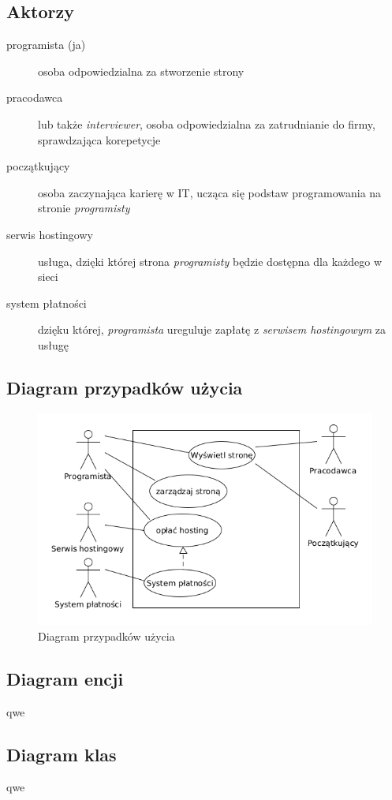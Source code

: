 \documentclass[11pt]{article}
\begin{document}
\subsection{Aktorzy}
\label{sec:org091554e}
\begin{description}
\item[{programista (ja)}] osoba odpowiedzialna za stworzenie strony
\item[{pracodawca}] lub także \emph{interviewer}, osoba odpowiedzialna za zatrudnianie do firmy, sprawdzająca korepetycje
\item[{początkujący}] osoba zaczynająca karierę w IT, ucząca się podstaw programowania na stronie \emph{programisty}
\item[{serwis hostingowy}] usługa, dzięki której strona \emph{programisty} będzie dostępna dla każdego w sieci
\item[{system płatności}] dzięku której, \emph{programista} ureguluje zapłatę z \emph{serwisem hostingowym} za usługę
\end{description}
\subsection{Diagram przypadków użycia}
\label{sec:org9f84e64}
\begin{figure}[htbp]
\centering
\includegraphics[width=.9\linewidth]{./images/diagram_przypadkow_uzycia.png}
\caption{Diagram przypadków użycia}
\end{figure}
\subsection{Diagram encji}
\label{sec:orge6cdeab}
qwe
\subsection{Diagram klas}
\label{sec:org7884d62}
qwe
\end{document}
